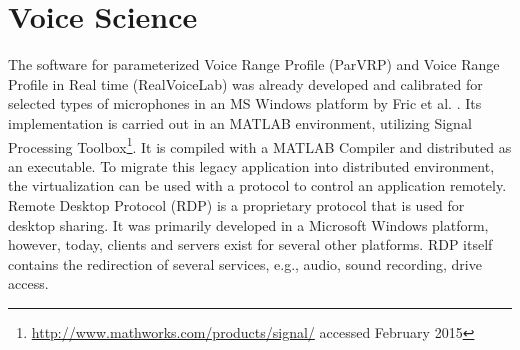 %
%
\section{Voice Science}
\label{sec:voice}

The software for parameterized Voice Range Profile (ParVRP) and Voice Range Profile in Real time (RealVoiceLab) was already developed and calibrated for selected types of microphones in an MS Windows platform by Fric et al. \cite{Fric2007,Fric2012}. Its implementation is carried out in an MATLAB environment, utilizing Signal Processing Toolbox\footnote{\url{http://www.mathworks.com/products/signal/} accessed February 2015}. It is compiled with a MATLAB Compiler and distributed as an executable. To migrate this legacy application into distributed environment, the virtualization can be used with a protocol to control an application remotely. Remote Desktop Protocol (RDP) is a proprietary protocol that is used for desktop sharing. It was primarily developed in a Microsoft Windows platform, however, today, clients and servers exist for several other platforms. RDP itself contains the redirection of several services, e.g., audio, sound recording, drive access. 

